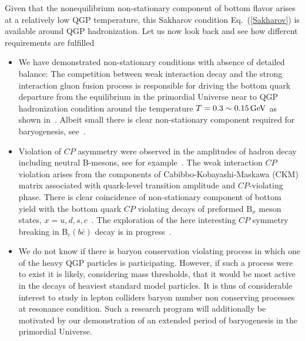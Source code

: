 Given that the nonequilibrium non-stationary component of bottom flavor arises at a relatively low QGP temperature, {\color{black}this Sakharov condition Eq.~(\ref{Sakharov}) is available around QGP hadronization.} Let us now look back and see how different requirements are fulfilled
\begin{itemize}
\item
 We have demonstrated non-stationary conditions with absence of detailed balance: The competition between weak interaction decay and the strong interaction gluon fusion process is responsible for driving the bottom quark departure from the equilibrium in the primordial Universe near to QGP hadronization condition around the temperature $T=0.3\sim0.15\text{\,GeV}$ as shown in~. Albeit small there is clear non-stationary component required for baryogenesis, see~.
\item Violation of $CP$ asymmetry were observed in the amplitudes of hadron decay including neutral B-mesons, see for example~\cite{LHCb:2019jta,LHCb:2020vut}. The weak interaction $CP$ violation arises from the components of Cabibbo-Kobayashi-Maskawa (CKM) matrix associated with quark-level transition amplitude and $CP$-violating phase. There is clear coincidence of non-stationary component of bottom yield with the bottom quark $CP$ violating decays of preformed $\mathrm{B}_x$ meson states, $x=u,d,s,c$~\cite{Karsch:1987pv,Brambilla:2010vq,Aarts:2011sm,Brambilla:2017zei,Bazavov:2018wmo,Offler:2019eij}. The exploration of the here interesting $CP$ symmetry breaking in B$_c(b\bar c)$ decay is in progress~\cite{ParticleDataGroup:2022pth,Tully:2019ltb,HFLAV:2019otj}.
\item
We do not know if there is baryon conservation violating process in which one of the heavy QGP particles is participating. However, if such a process were to exist it is likely, considering mass thresholds, that it would be most active in the decays of heaviest standard model particles. It is thus of considerable interest to study in lepton colliders baryon number non conserving processes at resonance condition. Such a research program will additionally be motivated by our demonstration of an extended period of baryogenesis in the primordial Universe. 
\end{itemize}

